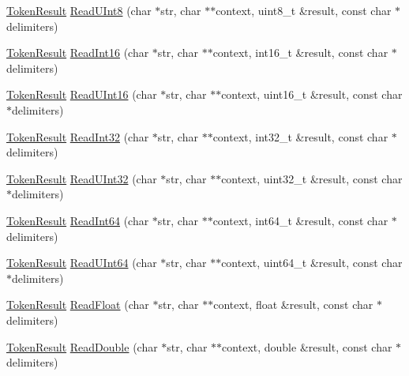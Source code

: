 \begin{DoxyCompactItemize}
\item 
\hyperlink{namespacemage_a2178ba2411db5912f41b2e7698c2037d}{Token\+Result} \hyperlink{namespacemage_a357352c06cab6568efee62ddc9dcc6c9}{Read\+U\+Int8} (char $\ast$str, char $\ast$$\ast$context, uint8\+\_\+t \&result, const char $\ast$delimiters)
\item 
\hyperlink{namespacemage_a2178ba2411db5912f41b2e7698c2037d}{Token\+Result} \hyperlink{namespacemage_ae5362fb3f4d97bcecd70e5baeb22834f}{Read\+Int16} (char $\ast$str, char $\ast$$\ast$context, int16\+\_\+t \&result, const char $\ast$delimiters)
\item 
\hyperlink{namespacemage_a2178ba2411db5912f41b2e7698c2037d}{Token\+Result} \hyperlink{namespacemage_a8e94422a0e962b98b2555bc95c6eff4c}{Read\+U\+Int16} (char $\ast$str, char $\ast$$\ast$context, uint16\+\_\+t \&result, const char $\ast$delimiters)
\item 
\hyperlink{namespacemage_a2178ba2411db5912f41b2e7698c2037d}{Token\+Result} \hyperlink{namespacemage_a159df5ff8941b52ea523d0ebb4c2fd24}{Read\+Int32} (char $\ast$str, char $\ast$$\ast$context, int32\+\_\+t \&result, const char $\ast$delimiters)
\item 
\hyperlink{namespacemage_a2178ba2411db5912f41b2e7698c2037d}{Token\+Result} \hyperlink{namespacemage_aaa46d4e55d14328f2c97ffbcd9167727}{Read\+U\+Int32} (char $\ast$str, char $\ast$$\ast$context, uint32\+\_\+t \&result, const char $\ast$delimiters)
\item 
\hyperlink{namespacemage_a2178ba2411db5912f41b2e7698c2037d}{Token\+Result} \hyperlink{namespacemage_aba0fbc26edf53c3ad92f954adca8e86d}{Read\+Int64} (char $\ast$str, char $\ast$$\ast$context, int64\+\_\+t \&result, const char $\ast$delimiters)
\item 
\hyperlink{namespacemage_a2178ba2411db5912f41b2e7698c2037d}{Token\+Result} \hyperlink{namespacemage_a87be513083fe421ab93f3007538ebef6}{Read\+U\+Int64} (char $\ast$str, char $\ast$$\ast$context, uint64\+\_\+t \&result, const char $\ast$delimiters)
\item 
\hyperlink{namespacemage_a2178ba2411db5912f41b2e7698c2037d}{Token\+Result} \hyperlink{namespacemage_a1856d70d5bbf0c311115f875222a6f1d}{Read\+Float} (char $\ast$str, char $\ast$$\ast$context, float \&result, const char $\ast$delimiters)
\item 
\hyperlink{namespacemage_a2178ba2411db5912f41b2e7698c2037d}{Token\+Result} \hyperlink{namespacemage_a7ea0807bd21210be516463c68be91cb8}{Read\+Double} (char $\ast$str, char $\ast$$\ast$context, double \&result, const char $\ast$delimiters)
$$
\end{DoxyCompactItemize}
